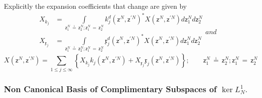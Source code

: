 \documentclass[aps,preprint]{revtex4}%
\begin{document}
Explicitly the expansion coefficients that change are given by
\begin{subequations}
\begin{align}
X_{k_{j}}  &  =%
{\displaystyle\int\limits_{\mathsf{z}_{1}^{N}\,\overset{_{1}}{=}%
\,\mathsf{z}_{2}^{N};\mathsf{z}_{1}^{N}\,\overset{}{=}\,\mathsf{z}_{2}^{N}}}
k_{j}^{d}\left(  \mathsf{z}^{N},\mathsf{z}^{\prime N}\right)  ^{\ast}X\left(
\mathsf{z}^{N},\mathsf{z}^{\prime N}\right)  d\mathsf{z}_{1}^{N}%
d\mathsf{z}_{2}^{N}\\
X_{\mathfrak{x}_{j}}  &  =%
{\displaystyle\int\limits_{\mathsf{z}_{1}^{N}\,\overset{_{1}}{=}%
\,\mathsf{z}_{2}^{N};\mathsf{z}_{1}^{N}\,\overset{}{=}\,\mathsf{z}_{2}^{N}}}
\mathfrak{x}_{j}^{d}\left(  \mathsf{z}^{N},\mathsf{z}^{\prime N}\right)
^{\ast}X\left(  \mathsf{z}^{N},\mathsf{z}^{\prime N}\right)  d\mathsf{z}%
_{1}^{N}d\mathsf{z}_{2}^{N}%
\end{align}
and
\end{subequations}
\begin{equation}
X\left(  \mathsf{z}^{N},\mathsf{z}^{\prime N}\right)  =%
{\displaystyle\sum\limits_{1\leq j\leq\infty}}
\left\{  X_{k_{j}}k_{j}\left(  \mathsf{z}^{N},\mathsf{z}^{\prime N}\right)
+X_{\mathfrak{x}_{j}}\mathfrak{x}_{j}\left(  \mathsf{z}^{N},\mathsf{z}^{\prime
N}\right)  \right\}  ;\qquad\mathsf{z}_{1}^{N}\,\overset{_{1}}{=}%
\,\mathsf{z}_{2}^{N};\mathsf{z}_{1}^{N}\,\overset{}{=}\,\mathsf{z}_{2}^{N}%
\end{equation}


\subsubsection{Non Canonical Basis of Complimentary Subspaces of $\ker
L_{N}^{1}.$}
\end{document}

